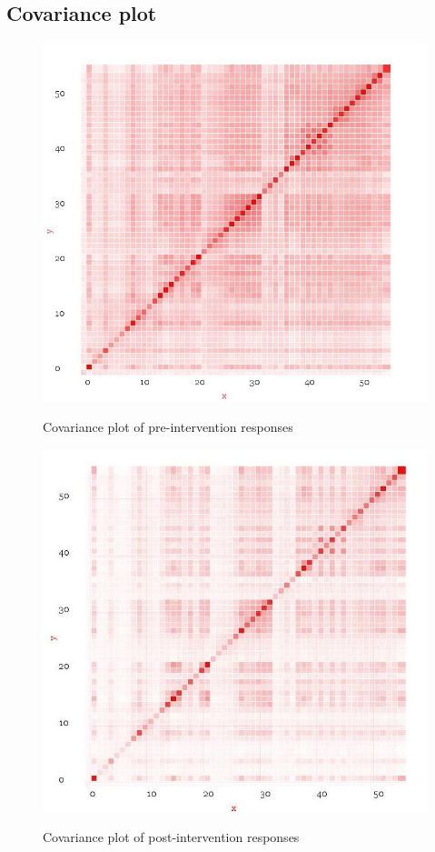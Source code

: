 \documentclass[10pt]{article}
\begin{document}
\subsection{Covariance plot}
\begin{figure}
\caption{Covariance plot of pre-intervention responses}
\label{CovariancePre}
\begin{center}
\includegraphics[width=120mm]{ReportMedia/CovariancePre.jpg}\\
\end{center}
\end{figure}

\begin{figure}
\caption{Covariance plot of post-intervention responses}
\label{CovariancePost}
\begin{center}
\includegraphics[width=120mm]{ReportMedia/CovariancePost.jpg}\\
\end{center}
\end{figure}
\newpage
\end{document}
